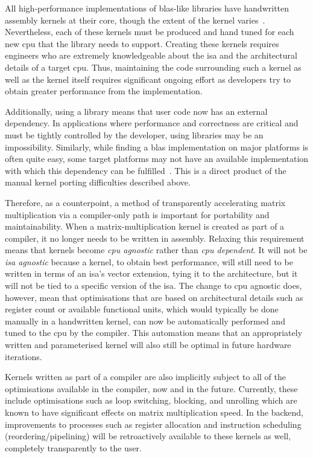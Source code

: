 \documentclass[\main/thesis.tex]{subfiles}
\begin{document}
All high-performance implementations of \gls{blas}-like libraries have handwritten assembly kernels at their core, though the extent of the kernel varies~\autocite{zee2016blis}.
Nevertheless, each of these kernels must be produced and hand tuned for each new \gls{cpu} that the library needs to support.
Creating these kernels requires engineers who are extremely knowledgeable about the \gls{isa} and the architectural details of a target \gls{cpu}.
Thus, maintaining the code surrounding such a kernel as well as the kernel itself requires significant ongoing effort as developers try to obtain greater performance from the implementation.

Additionally, using a library means that user code now has an external dependency.
In applications where performance and correctness are critical and must be tightly controlled by the developer, using libraries may be an impossibility.
Similarly, while finding a \gls{blas} implementation on major platforms is often quite easy, some target platforms may not have an available implementation with which this dependency can be fulfilled~\autocite{zee2016blis}.
This is a direct product of the manual kernel porting difficulties described above.

Therefore, as a counterpoint, a method of transparently accelerating matrix multiplication via a compiler-only path is important for portability and maintainability.
When a matrix-multiplication kernel is created as part of a compiler, it no longer needs to be written in assembly.
Relaxing this requirement means that kernels become \emph{\gls{cpu} agnostic} rather than \emph{\gls{cpu} dependent}.
It will not be \emph{\gls{isa} agnostic} because a kernel, to obtain best performance, will still need to be written in terms of an \gls{isa}'s vector extension, tying it to the architecture, but it will not be tied to a specific version of the \gls{isa}.
The change to \gls{cpu} agnostic does, however, mean that optimisations that are based on architectural details such as register count or available functional units, which would typically be done manually in a handwritten kernel, can now be automatically performed and tuned to the \gls{cpu} by the compiler.
This automation means that an appropriately written and parameterised kernel will also still be optimal in future hardware iterations.

Kernels written as part of a compiler are also implicitly subject to all of the optimisations available in the compiler, now and in the future.
Currently, these include optimisations such as loop switching, blocking, and unrolling which are known to have significant effects on matrix multiplication speed.
In the backend, improvements to processes such as register allocation and instruction scheduling (reordering/pipelining) will be retroactively available to these kernels as well, completely transparently to the user.
\end{document}
